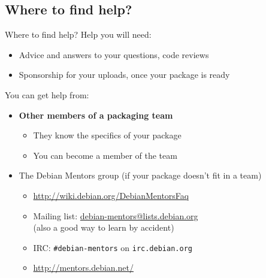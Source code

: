\documentclass[10pt,final]{beamer}
\begin{document}
\subsection{Where to find help?}
\begin{frame}{Where to find help?}
  Help you will need:
  \begin{itemize}
  \item Advice and answers to your questions, code reviews
  \item Sponsorship for your uploads, once your package is ready
  \end{itemize}
  \br
  You can get help from:
  \begin{itemize}
	  \item \textbf{Other members of a packaging team}
    \begin{itemize}
    \item They know the specifics of your package
    \item You can become a member of the team
    \end{itemize}
    \hbr
  \item The Debian Mentors group (if your package doesn't fit in a team)
    \begin{itemize}
    \item \url{http://wiki.debian.org/DebianMentorsFaq}
    \item Mailing list: \url{debian-mentors@lists.debian.org}\\
	    {\small (also a good way to learn by accident)}
    \item IRC: \texttt{\#debian-mentors} on \texttt{irc.debian.org}
    \item \url{http://mentors.debian.net/}
    \end{itemize}
  \end{itemize}
\end{frame}
\end{document}
